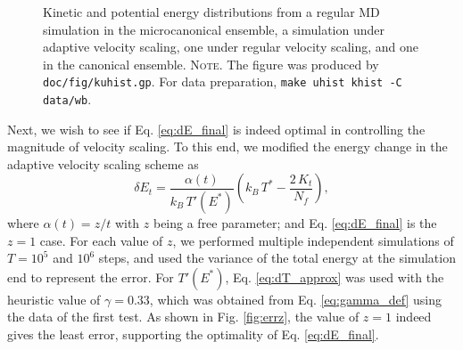 \documentclass[reprint]{revtex4-1}
\newcommand{\note}[1]{{\color{DarkGreen}\footnotesize \textsc{Note.} #1}}
\begin{document}
\begin{figure}[h]
\begin{center}
  \caption{
    \label{fig:kuhist}
    Kinetic and potential energy distributions
    from a regular MD simulation in the microcanonical ensemble,
    a simulation under adaptive velocity scaling,
    one under regular velocity scaling,
    and one in the canonical ensemble.
    \note{The figure was produced by \texttt{doc/fig/kuhist.gp}.
      For data preparation, \texttt{make uhist khist -C data/wb}.
    }%
  }
\end{center}
\end{figure}


Next, we wish to see if Eq. \eqref{eq:dE_final}
is indeed optimal in controlling the magnitude of velocity scaling.
%
To this end, we modified the energy change in
the adaptive velocity scaling scheme as
%
\begin{equation}
  \delta E_t
  =
  \frac{ \alpha(t) } { k_B \, T'(E^*) }
  \left(
   k_B \, T^* -
   \frac{ 2 \, K_t } { N_f }
  \right)
  ,
  \label{eq:dE_mod}
\end{equation}
%
where $\alpha(t) = z/t$ with $z$ being a free parameter;
and Eq. \eqref{eq:dE_final} is the $z = 1$ case.
%
For each value of $z$,
we performed multiple independent simulations of
$T = 10^5$ and $10^6$ steps,
and used the variance of the total energy at the simulation end
to represent the error.
%
For $T'(E^*)$,
Eq. \eqref{eq:dT_approx} was used with the heuristic value of
$\gamma = 0.33$,
which was obtained from Eq. \eqref{eq:gamma_def}
using the data of the first test.
%
As shown in Fig. \ref{fig:errz},
the value of $z = 1$
indeed gives the least error,
supporting the optimality of Eq. \eqref{eq:dE_final}.
\end{document}
